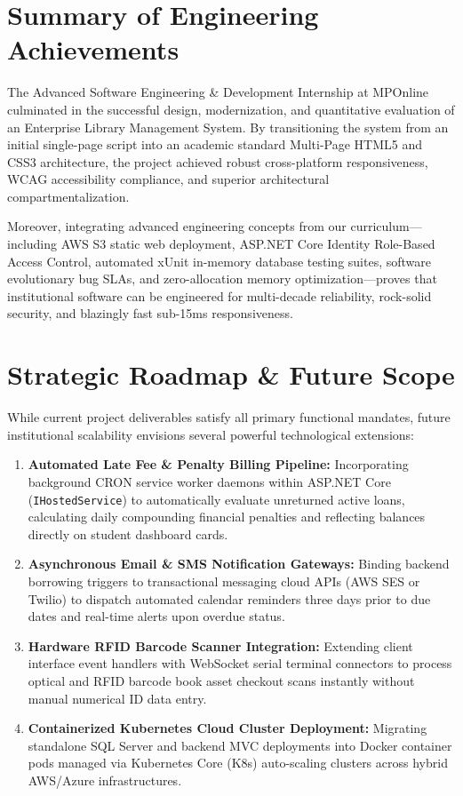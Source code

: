 \documentclass[11pt,a4paper]{report}
\begin{document}
\section{Summary of Engineering Achievements}
The Advanced Software Engineering \& Development Internship at MPOnline culminated in the successful design, modernization, and quantitative evaluation of an Enterprise Library Management System. By transitioning the system from an initial single-page script into an academic standard Multi-Page HTML5 and CSS3 architecture, the project achieved robust cross-platform responsiveness, WCAG accessibility compliance, and superior architectural compartmentalization.

Moreover, integrating advanced engineering concepts from our curriculum---including AWS S3 static web deployment, ASP.NET Core Identity Role-Based Access Control, automated xUnit in-memory database testing suites, software evolutionary bug SLAs, and zero-allocation memory optimization---proves that institutional software can be engineered for multi-decade reliability, rock-solid security, and blazingly fast sub-15ms responsiveness.

\section{Strategic Roadmap \& Future Scope}
While current project deliverables satisfy all primary functional mandates, future institutional scalability envisions several powerful technological extensions:
\begin{enumerate}[leftmargin=1.5em]
    \item \textbf{Automated Late Fee \& Penalty Billing Pipeline:} Incorporating background CRON service worker daemons within ASP.NET Core (\texttt{IHostedService}) to automatically evaluate unreturned active loans, calculating daily compounding financial penalties and reflecting balances directly on student dashboard cards.
    \item \textbf{Asynchronous Email \& SMS Notification Gateways:} Binding backend borrowing triggers to transactional messaging cloud APIs (AWS SES or Twilio) to dispatch automated calendar reminders three days prior to due dates and real-time alerts upon overdue status.
    \item \textbf{Hardware RFID Barcode Scanner Integration:} Extending client interface event handlers with WebSocket serial terminal connectors to process optical and RFID barcode book asset checkout scans instantly without manual numerical ID data entry.
    \item \textbf{Containerized Kubernetes Cloud Cluster Deployment:} Migrating standalone SQL Server and backend MVC deployments into Docker container pods managed via Kubernetes Core (K8s) auto-scaling clusters across hybrid AWS/Azure infrastructures.
\end{enumerate}
\end{document}
